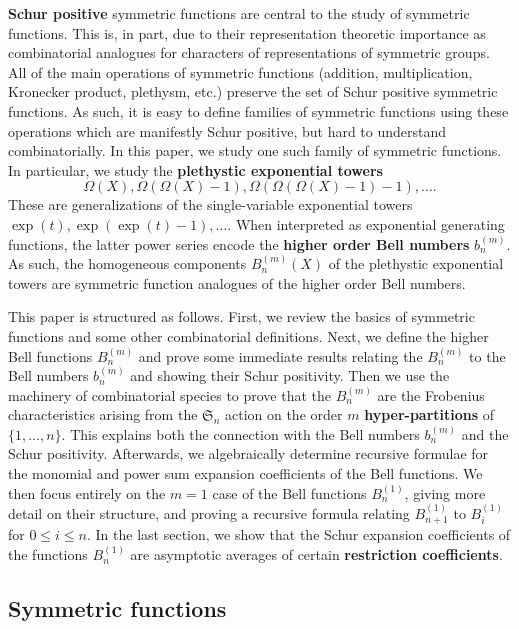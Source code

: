 \documentclass[12pt,reqno]{amsart}
\theoremstyle{definition}
\begin{document}
\textbf{Schur positive} symmetric functions are central to the study of symmetric functions. This is, in part, due to their representation theoretic importance as combinatorial analogues for characters of representations of symmetric groups. All of the main operations of symmetric functions (addition, multiplication, Kronecker product, plethysm, etc.) preserve the set of Schur positive symmetric functions. As such, it is easy to define families of symmetric functions using these operations which are manifestly Schur positive, but hard to understand combinatorially. In this paper, we study one such family of symmetric functions. In particular, we study the \textbf{plethystic exponential towers} 
$$\Omega(X),\Omega(\Omega(X)-1),\Omega(\Omega(\Omega(X)-1)-1),\ldots.$$ These are generalizations of the single-variable exponential towers $\exp(t),\exp(\exp(t)-1),\ldots .$ When interpreted as exponential generating functions, the latter power series encode the \textbf{higher order Bell numbers} $b_n^{(m)}$. As such, the homogeneous components $B_n^{(m)}(X)$ of the plethystic exponential towers are symmetric function analogues of the higher order Bell numbers. 

This paper is structured as follows. First, we review the basics of symmetric functions and some other combinatorial definitions. Next, we define the higher Bell functions $B_n^{(m)}$ and prove some immediate results relating the $B_n^{(m)}$ to the Bell numbers $b_n^{(m)}$ and showing their Schur positivity. Then we use the machinery of combinatorial species to prove that the $B_n^{(m)}$ are the Frobenius characteristics arising from the $\mathfrak{S}_n$ action on the order $m$ \textbf{hyper-partitions} of $\{1,\ldots,n\}.$ This explains both the connection with the Bell numbers $b_n^{(m)}$ and the Schur positivity. Afterwards, we algebraically determine recursive formulae for the monomial and power sum expansion coefficients of the Bell functions. We then focus entirely on the $m=1$ case of the Bell functions $B_n^{(1)}$, giving more detail on their structure, and proving a recursive formula relating $B^{(1)}_{n+1}$ to $B^{(1)}_{i}$ for $0\leq i \leq n$. In the last section, we show that the Schur expansion coefficients of the functions $B_n^{(1)}$ are asymptotic averages of certain \textbf{ restriction coefficients}. 

\subsection{Symmetric functions}
\end{document}
